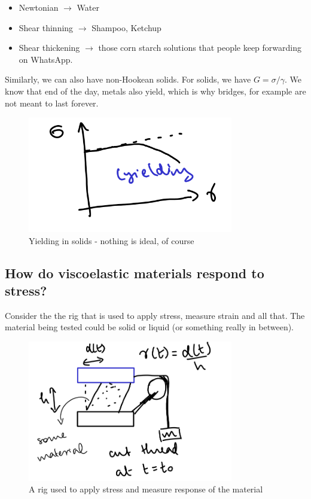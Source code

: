 \documentclass[a4paper]{article}
\begin{document}
\begin{itemize}
	\item Newtonian $\to $ Water
	\item Shear thinning $\to $ Shampoo, Ketchup
	\item Shear thickening $\to $ those corn starch solutions that people keep forwarding on WhatsApp.
\end{itemize}

Similarly, we can also have non-Hookean solids. For solids, we have
$G = \sigma/\gamma$. We know that end of the day, metals also yield,
which is why bridges, for example are not meant to last forever.
\begin{figure}[h]
	\centering
	\includegraphics[width=0.8\textwidth]{figures/nonhooke.png}
	\caption{Yielding in solids - nothing is ideal, of course}
	\label{fig:figures-nonhooke-png}
\end{figure}

\subsection*{How do viscoelastic materials respond to stress?}
Consider the the rig that is used to apply stress, measure strain
and all that. The material being tested could be solid or liquid (or
something really in between).
\begin{figure}[h]
	\centering
	\includegraphics[width=0.8\textwidth]{figures/rig.png}
	\caption{A rig used to apply stress and measure response of the material}
	\label{fig:figures-rig-png}
\end{figure}
\end{document}
